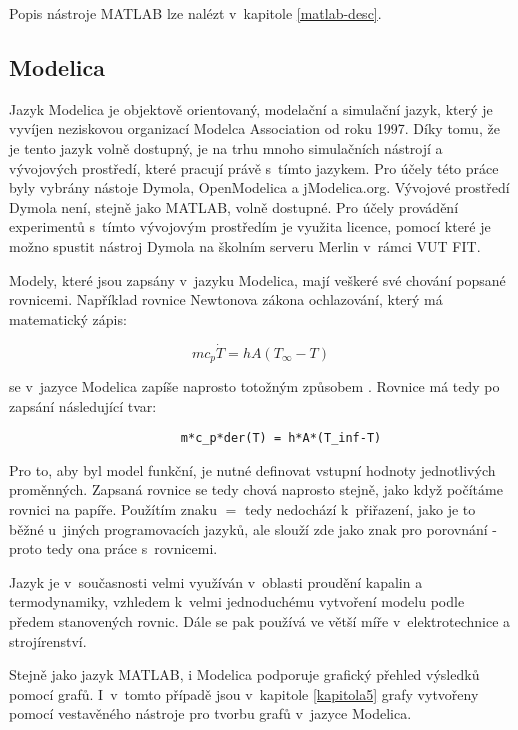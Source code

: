 Popis nástroje MATLAB lze nalézt v~kapitole \ref{matlab-desc}.
\subsection{Modelica}
\label{modelica-lang}
Jazyk Modelica je objektově orientovaný, modelační a simulační jazyk, který je vyvíjen neziskovou organizací Modelca Association od roku 1997. Díky tomu, že je tento jazyk volně dostupný, je na trhu mnoho simulačních nástrojí a vývojových prostředí, které pracují právě s~tímto jazykem. Pro účely této práce byly vybrány nástoje Dymola, OpenModelica a jModelica.org. Vývojové prostředí Dymola není, stejně jako MATLAB, volně dostupné. Pro účely provádění experimentů s~tímto vývojovým prostředím je využita licence, pomocí které je možno spustit nástroj Dymola na školním serveru Merlin v~rámci VUT FIT.

Modely, které jsou zapsány v~jazyku Modelica, mají veškeré své chování popsané rovnicemi. Například rovnice Newtonova zákona ochlazování, který má matematický zápis:

\begin{equation}
    mc_p\Dot{T} = hA(T_{\infty} - T)
\end{equation}

se v~jazyce Modelica zapíše naprosto totožným způsobem \cite{modelica-example}. Rovnice má tedy po zapsání následující tvar:

\begin{verbatim}
                        m*c_p*der(T) = h*A*(T_inf-T)
\end{verbatim}

Pro to, aby byl model funkční, je nutné definovat vstupní hodnoty jednotlivých proměnných. Zapsaná rovnice se tedy chová naprosto stejně, jako když počítáme rovnici na papíře. Použítím znaku $ = $ tedy nedochází k~přiřazení, jako je to běžné u~jiných programovacích jazyků, ale slouží zde jako znak pro porovnání - proto tedy ona práce s~rovnicemi.

Jazyk je v~současnosti velmi využíván v~oblasti proudění kapalin a termodynamiky, vzhledem k~velmi jednoduchému vytvoření modelu podle předem stanovených rovnic. Dále se pak používá ve větší míře v~elektrotechnice a strojírenství.

Stejně jako jazyk MATLAB, i Modelica podporuje grafický přehled výsledků pomocí grafů. I~v~tomto případě jsou v~kapitole \ref{kapitola5} grafy vytvořeny pomocí vestavěného nástroje pro tvorbu grafů v~jazyce Modelica.

